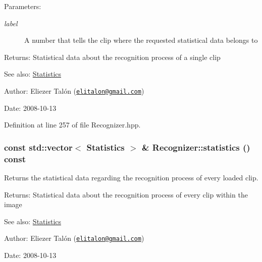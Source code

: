 \begin{Desc}
\item[Parameters:]
\begin{description}
\item[{\em label}]A number that tells the clip where the requested statistical data belongs to\end{description}
\end{Desc}
\begin{Desc}
\item[Returns:]Statistical data about the recognition process of a single clip\end{Desc}
\begin{Desc}
\item[See also:]\hyperlink{class_statistics}{Statistics}\end{Desc}
\begin{Desc}
\item[Author:]Eliezer Talón (\href{mailto:elitalon@gmail.com}{\tt elitalon@gmail.com}) \end{Desc}
\begin{Desc}
\item[Date:]2008-10-13 \end{Desc}


Definition at line 257 of file Recognizer.hpp.\hypertarget{class_recognizer_8b38356d2741969e67cd6b4f507897ba}{
\subsubsection[statistics]{\setlength{\rightskip}{0pt plus 5cm}const std::vector$<$ {\bf Statistics} $>$ \& Recognizer::statistics () const}}
\label{class_recognizer_8b38356d2741969e67cd6b4f507897ba}


Returns the statistical data regarding the recognition process of every loaded clip. 

\begin{Desc}
\item[Returns:]Statistical data about the recognition process of every clip within the image\end{Desc}
\begin{Desc}
\item[See also:]\hyperlink{class_statistics}{Statistics}\end{Desc}
\begin{Desc}
\item[Author:]Eliezer Talón (\href{mailto:elitalon@gmail.com}{\tt elitalon@gmail.com}) \end{Desc}
\begin{Desc}
\item[Date:]2008-10-13 \end{Desc}


